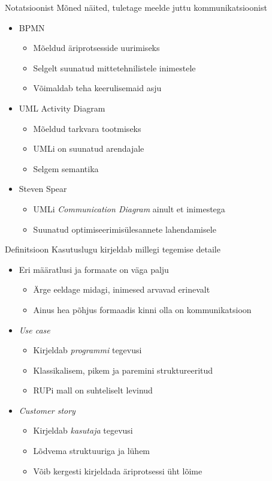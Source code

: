 \documentclass{beamer}
\begin{document}
\begin{frame}{Notatsioonist}
	Mõned näited, tuletage meelde juttu kommunikatsioonist
	\begin{itemize}
		\item BPMN
		\begin{itemize}
			\item Mõeldud äriprotsesside uurimiseks
			\item Selgelt suunatud mittetehnilistele inimestele
			\item Võimaldab teha keerulisemaid asju
		\end{itemize}
		\item UML Activity Diagram
		\begin{itemize}
			\item Mõeldud tarkvara tootmiseks
			\item UMLi on suunatud arendajale
			\item Selgem semantika
		\end{itemize}
		\item Steven Spear
		\begin{itemize}
			\item UMLi \emph{Communication Diagram} ainult et inimestega
			\item Suunatud optimiseerimisülesannete lahendamisele
		\end{itemize}
	\end{itemize}
\end{frame}

\begin{frame}{Definitsioon}
	Kasutuslugu kirjeldab millegi tegemise detaile
	\begin{itemize}
		\item Eri määratlusi ja formaate on väga palju
		\begin{itemize}
			\item Ärge eeldage midagi, inimesed arvavad erinevalt
			\item Ainus hea põhjus formaadis kinni olla on kommunikatsioon
		\end{itemize}
		\item \emph{Use case}
		\begin{itemize}
			\item Kirjeldab \emph{programmi} tegevusi
			\item Klassikalisem, pikem ja paremini struktureeritud
			\item RUPi mall on suhteliselt levinud
		\end{itemize}
		\item \emph{Customer story}
		\begin{itemize}
			\item Kirjeldab \emph{kasutaja} tegevusi
			\item Lõdvema struktuuriga ja lühem
			\item Võib kergesti kirjeldada äriprotsessi üht lõime
		\end{itemize}
	\end{itemize}
\end{frame}
\end{document}
